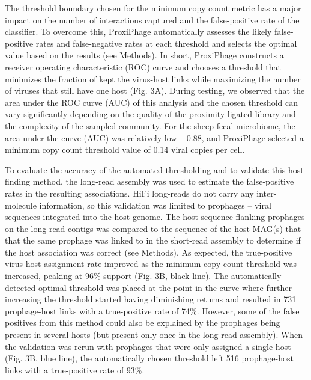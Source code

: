     The threshold boundary chosen for the minimum copy count metric has a major impact on the number of interactions captured and the false-positive rate of the classifier. To overcome this, ProxiPhage automatically assesses the likely false-positive rates and false-negative rates at each threshold and selects the optimal value based on the results (see Methods).  In short, ProxiPhage constructs a receiver operating characteristic (ROC) curve and chooses a threshold that minimizes the fraction of kept the virus-host links while maximizing the number of viruses that still have one host (Fig. 3A). During testing, we observed that the area under the ROC curve (AUC) of this analysis and the chosen threshold can vary significantly depending on the quality of the proximity ligated library and the complexity of the sampled community. For the sheep fecal microbiome, the area under the curve (AUC) was relatively low – 0.88, and ProxiPhage selected a minimum copy count threshold value of 0.14 viral copies per cell. 
    
    To evaluate the accuracy of the automated thresholding and to validate this host-finding method, the long-read assembly was used to estimate the false-positive rates in the resulting associations. HiFi long-reads do not carry any inter-molecule information, so this validation was limited to prophages – viral sequences integrated into the host genome. The host sequence flanking prophages on the long-read contigs was compared to the sequence of the host MAG(s) that that the same prophage was linked to in the short-read assembly to determine if the host association was correct (see Methods). As expected, the true-positive virus-host assignment rate improved as the minimum copy count threshold was increased, peaking at 96\% support (Fig. 3B, black line). The automatically detected optimal threshold was placed at the point in the curve where further increasing the threshold started having diminishing returns and resulted in 731 prophage-host links with a true-positive rate of 74\%. However, some of the false positives from this method could also be explained by the prophages being present in several hosts (but present only once in the long-read assembly). When the validation was rerun with prophages that were only assigned a single host (Fig. 3B, blue line), the automatically chosen threshold left 516 prophage-host links with a true-positive rate of 93\%.



